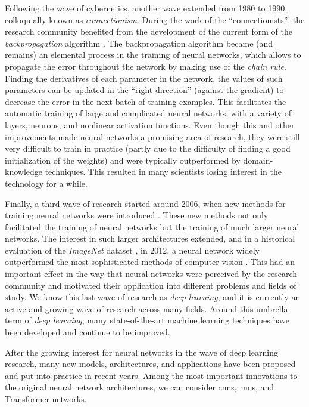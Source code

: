 Following the wave of cybernetics, another wave extended
from 1980 to 1990, colloquially known as
\emph{connectionism}. During the work of the
``connectionists'', the research community benefited
from the development of the current form of the
\emph{backpropagation} algorithm
\parencite{rumelhart1988learning}. The backpropagation
algorithm became (and remains) an elemental process in the
training of neural networks, which allows to propagate the
error throughout the network by making use of the
\emph{chain rule}. Finding the derivatives of each parameter
in the network, the values of such parameters can be updated
in the ``right direction'' (against the gradient) to
decrease the error in the next batch of training examples.
This facilitates the automatic training of large and
complicated neural networks, with a variety of layers,
neurons, and nonlinear activation functions. Even though
this and other improvements made neural networks a promising
area of research, they were still very difficult to train in
practice (partly due to the difficulty of finding a good
initialization of the weights) and were typically
outperformed by domain-knowledge techniques. This resulted
in many scientists losing interest in the technology for a
while.

Finally, a third wave of research started around 2006, when
new methods for training neural networks were introduced
\parencite{hinton2006fast}. These new methods not only
facilitated the training of neural networks but the training
of much larger neural networks. The interest in such larger
architectures extended, and in a historical evaluation of
the \emph{ImageNet} dataset \parencite{deng2009imagenet}, in
2012, a neural network widely outperformed the most
sophisticated methods of computer vision
\parencite{krizhevsky2012imagenet}. This had an important
effect in the way that neural networks were perceived by the
research community and motivated their application into
different problems and fields of study. We know this last
wave of research as \emph{deep learning}, and it is
currently an active and growing wave of research across many
fields. Around this umbrella term of \emph{deep learning},
many state-of-the-art machine learning techniques have been
developed and continue to be improved.

 After the growing
interest for neural networks in the wave of deep learning
research, many new models, architectures, and applications
have been proposed and put into practice in recent years.
Among the most important innovations to the original neural
network architectures, we can consider \glspl{cnn},
\glspl{rnn}, and Transformer networks.

